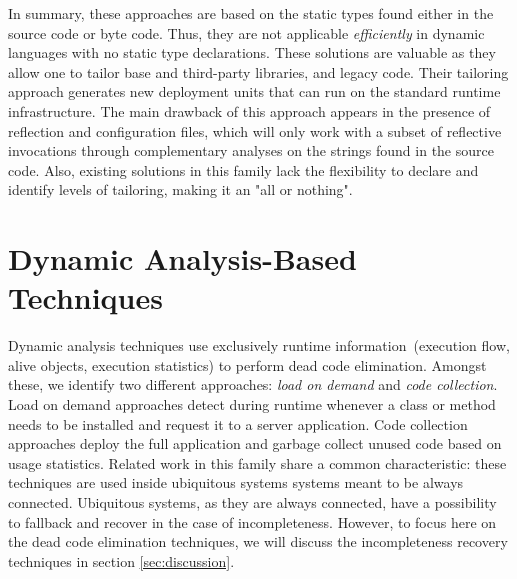 In summary, these approaches are based on the static types found either in the source code or byte code. Thus, they are not applicable \emph{efficiently} in dynamic languages with no static type declarations. These solutions are valuable as they allow one to tailor base and third-party libraries, and legacy code. Their tailoring approach generates new deployment units that can run on the standard runtime infrastructure. The main drawback of this approach appears in the presence of reflection and configuration files, which will only work with a subset of reflective invocations through complementary analyses on the strings found in the source code. Also, existing solutions in this family lack the flexibility to declare and identify levels of tailoring, making it an "all or nothing".

\section{Dynamic Analysis-Based Techniques}\label{section:dynamic_rw}

Dynamic analysis techniques use exclusively runtime information~(\ie execution flow, alive objects, execution statistics) to perform dead code elimination. Amongst these, we identify two different approaches: \emph{load on demand} and \emph{code collection}. Load on demand approaches detect during runtime whenever a class or method needs to be installed and request it to a server application. Code collection approaches deploy the full application  and garbage collect unused code based on usage statistics. Related work in this family share a common characteristic: these techniques are used inside ubiquitous systems \ie systems meant to be always connected. Ubiquitous systems, as they are always connected, have a possibility to fallback and recover in the case of incompleteness. However, to focus here on the dead code elimination techniques, we will discuss the incompleteness recovery techniques in section \ref{sec:discussion}.

